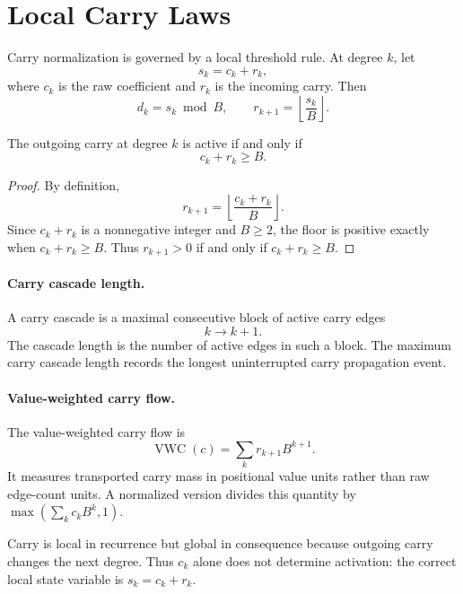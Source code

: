 \section{Local Carry Laws}

Carry normalization is governed by a local threshold rule. At degree \(k\), let
\[
    s_k = c_k + r_k,
\]
where \(c_k\) is the raw coefficient and \(r_k\) is the incoming carry. Then
\[
    d_k = s_k \bmod B,\qquad
    r_{k+1} = \left\lfloor \frac{s_k}{B} \right\rfloor.
\]

\begin{proposition}
The outgoing carry at degree \(k\) is active if and only if
\[
    c_k + r_k \ge B.
\]
\end{proposition}

\begin{proof}
By definition,
\[
    r_{k+1} = \left\lfloor \frac{c_k+r_k}{B} \right\rfloor.
\]
Since \(c_k+r_k\) is a nonnegative integer and \(B\ge 2\), the floor is
positive exactly when \(c_k+r_k \ge B\). Thus \(r_{k+1}>0\) if and only if
\(c_k+r_k \ge B\).
\end{proof}

\paragraph{Carry cascade length.}
A carry cascade is a maximal consecutive block of active carry edges
\[
    k \to k+1.
\]
The cascade length is the number of active edges in such a block. The maximum
carry cascade length records the longest uninterrupted carry propagation event.

\paragraph{Value-weighted carry flow.}
The value-weighted carry flow is
\[
    \operatorname{VWC}(c) = \sum_k r_{k+1} B^{k+1}.
\]
It measures transported carry mass in positional value units rather than raw
edge-count units. A normalized version divides this quantity by
\(\max(\sum_k c_k B^k,1)\).

Carry is local in recurrence but global in consequence because outgoing carry
changes the next degree. Thus \(c_k\) alone does not determine activation:
the correct local state variable is \(s_k=c_k+r_k\).
